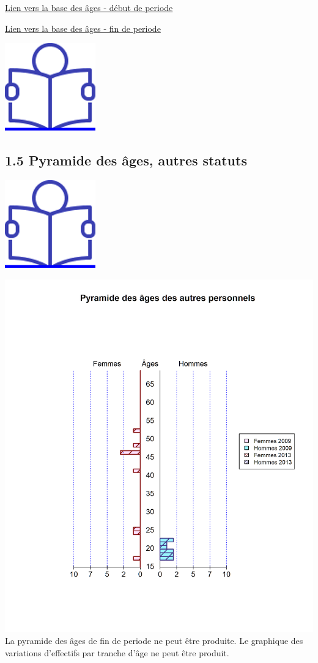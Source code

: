 \href{../Bases/Effectifs/Pyramide-des-ages-des-non-titulaires_2008.csv}{Lien
vers la base des âges - début de periode}

\href{../Bases/Effectifs/Pyramide-des-ages-des-non-titulaires_2012.csv}{Lien
vers la base des âges - fin de periode}

\href{../Docs/Notices/fiche_1.odt}{\includegraphics{icones/Notice.png}}

\hypertarget{pyramide-des-ages-autres-statuts}{%
\subsection{1.5 Pyramide des âges, autres statuts
~}\label{pyramide-des-ages-autres-statuts}}

\href{../Docs/Notices/fiche_2.odt}{\includegraphics{icones/Notice.png}}

\includegraphics{altair_files/figure-latex/unnamed-chunk-29-1.png} La
pyramide des âges de fin de periode ne peut être produite. \newpage Le
graphique des variations d'effectifs par tranche d'âge ne peut être
produit.

